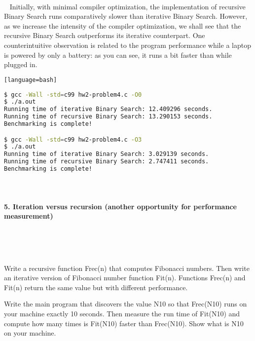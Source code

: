 \documentclass{article}
\begin{document}
\paragraph{}\
	\rmfamily
	Initially, with minimal compiler optimization, the implementation of recursive Binary Search runs comparatively slower than iterative Binary Search.
	However, as we increase the intensity of the compiler optimization, we shall see that the recursive Binary Search outperforms its iterative counterpart. One counterintuitive observation is related to the program performance while a laptop is powered by only a battery: as you can see, it runs a bit faster than while plugged in.

	\ttfamily
	\begin{lstlisting}[basicstyle=\small, language=bash][language=bash]	
	
$ gcc -Wall -std=c99 hw2-problem4.c -O0
$ ./a.out
Running time of iterative Binary Search: 12.409296 seconds.
Running time of recursive Binary Search: 13.290153 seconds.
Benchmarking is complete!

$ gcc -Wall -std=c99 hw2-problem4.c -O3
$ ./a.out
Running time of iterative Binary Search: 3.029139 seconds.
Running time of recursive Binary Search: 2.747411 seconds.
Benchmarking is complete!
	\end{lstlisting}

\paragraph{}\

	
	\rmfamily
	
	\paragraph{5. Iteration versus recursion (another opportunity for performance measurement) }\
	
	\rmfamily\
	
		Write a recursive function Frec(n) that computes Fibonacci numbers. Then write an iterative version of Fibonacci number function Fit(n). Functions Frec(n) and Fit(n) return the same value but with different performance.
		\newline
		
		Write the main program that discovers the value N10 so that Frec(N10) runs on your machine exactly 10 seconds. Then measure the run time of Fit(N10) and compute how many times is Fit(N10) faster than Frec(N10). Show what is N10 on your machine.
		\newline
		
\end{document}
